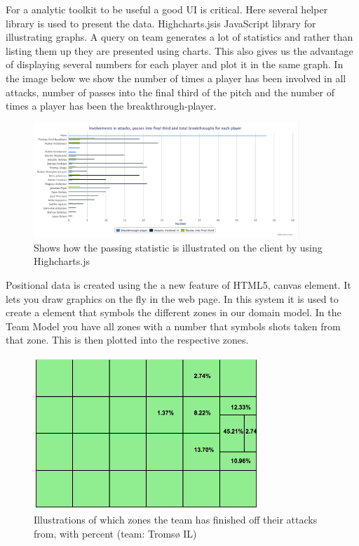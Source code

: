 For a analytic toolkit to be useful a good UI is critical. Here several helper library is used to present the data. Highcharts.js\footnotemark is JavaScript library for illustrating graphs. A query on team generates a lot of statistics and rather than listing them up they are presented using charts. This also gives us the advantage of displaying several numbers for each player and plot it in the same graph. In the image below we show the number of times a player has been involved in all attacks, number of passes into the final third of the pitch and the number of times a player has been the breakthrough-player.


\begin{figure}[ht!]
\centering
\includegraphics[width=100mm]{images/general/chart_passes.png}
\caption{Shows how the passing statistic is illustrated on the client by using Highcharts.js}
\label{overflow}
\end{figure}

Positional data is created using the a new feature of HTML5, canvas element. It lets you draw graphics on the fly in the web page. In this system it is used to create a element that symbols the different zones in our domain model. In the Team Model you have all zones with a number that symbols shots taken from that zone. This is then plotted into the respective zones.

\begin{figure}[ht!]
\centering
\includegraphics[width=85mm]{images/general/finishing_zones.png}
\caption{Illustrations of which zones the team has finished off their attacks from, with percent (team: Tromsø IL)}
\label{overflow}
\end{figure}

